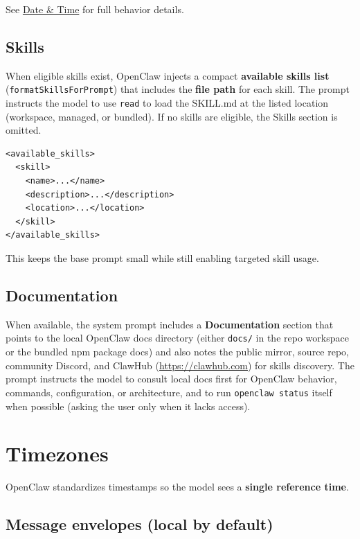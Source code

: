 See \href{/date-time}{Date \& Time} for full behavior details.

\subsection{Skills}


When eligible skills exist, OpenClaw injects a compact \textbf{available skills list}
(\texttt{formatSkillsForPrompt}) that includes the \textbf{file path} for each skill. The
prompt instructs the model to use \texttt{read} to load the SKILL.md at the listed
location (workspace, managed, or bundled). If no skills are eligible, the
Skills section is omitted.

\begin{lstlisting}
<available_skills>
  <skill>
    <name>...</name>
    <description>...</description>
    <location>...</location>
  </skill>
</available_skills>
\end{lstlisting}


This keeps the base prompt small while still enabling targeted skill usage.

\subsection{Documentation}


When available, the system prompt includes a \textbf{Documentation} section that points to the
local OpenClaw docs directory (either \texttt{docs/} in the repo workspace or the bundled npm
package docs) and also notes the public mirror, source repo, community Discord, and
ClawHub (\href{https://clawhub.com}{https://clawhub.com}) for skills discovery. The prompt instructs the model to consult local docs first
for OpenClaw behavior, commands, configuration, or architecture, and to run
\texttt{openclaw status} itself when possible (asking the user only when it lacks access).


\clearpage

\section{Timezones}


OpenClaw standardizes timestamps so the model sees a \textbf{single reference time}.

\subsection{Message envelopes (local by default)}


